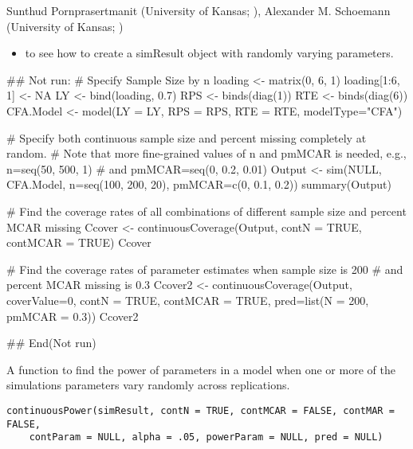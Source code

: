 \documentclass[a4paper]{book}
\begin{document}
%
\begin{Author}\relax
Sunthud Pornprasertmanit (University of Kansas; ), Alexander M. Schoemann (University of Kansas; )
\end{Author}
%
\begin{SeeAlso}\relax
\begin{itemize}

\item {} to see how to create a simResult object with randomly varying parameters.

\end{itemize}

\end{SeeAlso}
%
\begin{Examples}
\begin{ExampleCode}
## Not run: 
# Specify Sample Size by n
loading <- matrix(0, 6, 1)
loading[1:6, 1] <- NA
LY <- bind(loading, 0.7)
RPS <- binds(diag(1))
RTE <- binds(diag(6))
CFA.Model <- model(LY = LY, RPS = RPS, RTE = RTE, modelType="CFA")

# Specify both continuous sample size and percent missing completely at random. 
# Note that more fine-grained values of n and pmMCAR is needed, e.g., n=seq(50, 500, 1) 
# and pmMCAR=seq(0, 0.2, 0.01)
Output <- sim(NULL, CFA.Model, n=seq(100, 200, 20), pmMCAR=c(0, 0.1, 0.2))
summary(Output)

# Find the coverage rates of all combinations of different sample size and percent MCAR missing
Ccover <- continuousCoverage(Output, contN = TRUE, contMCAR = TRUE)
Ccover

# Find the coverage rates of parameter estimates when sample size is 200 
# and percent MCAR missing is 0.3
Ccover2 <- continuousCoverage(Output, coverValue=0, contN = TRUE, contMCAR = TRUE, 
     pred=list(N = 200, pmMCAR = 0.3))
Ccover2

## End(Not run)
\end{ExampleCode}
\end{Examples}
%
\begin{Description}\relax
A function to find the power of  parameters in a model when one or more of the simulations parameters vary randomly across replications.
\end{Description}
%
\begin{Usage}
\begin{verbatim}
continuousPower(simResult, contN = TRUE, contMCAR = FALSE, contMAR = FALSE, 
	contParam = NULL, alpha = .05, powerParam = NULL, pred = NULL)
\end{verbatim}
\end{Usage}
\end{document}
